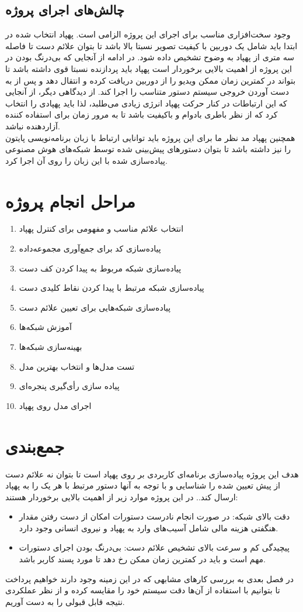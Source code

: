 \subsection{چالش‌های اجرای پروژه}
وجود سخت‌افزاری مناسب برای اجرای این پروژه الزامی است. پهپاد انتخاب شده در ابتدا باید شامل یک دوربین با کیفیت تصویر
نسبتا بالا باشد تا بتوان علائم دست تا فاصله سه متری از پهپاد به وضوح تشخيص داده شود.
در ادامه از آنجایی که بی‌درنگ بودن در این پروژه از اهمیت بالایی برخوردار است پهپاد باید پردازنده نسبتا قوی داشته باشد تا بتواند در کمترین زمان ممکن ویدیو را از دوربین دریافت کرده و انتقال دهد و پس از به دست آوردن خروجی سیستم دستور متناسب را اجرا کند. از دیدگاهی دیگر، از آنجایی که این ارتباطات در کنار حرکت پهپاد انرژی زیادی می‌طلبد، لذا باید پهپادی را انتخاب کرد
که از نظر باطری بادوام و باکیفیت باشد تا به مرور زمان برای استفاده کننده آزاردهنده نباشد.
\\
همچنین پهپاد مد نظر ما برای این پروژه باید توانایی ارتباط با  زبان برنامه‌نویسی پایتون را نیز داشته باشد تا بتوان دستورهای پیش‌بینی شده توسط شبکه‌های هوش مصنوعی پیاده‌سازی شده با این زبان را روی آن اجرا کرد.


\section{مراحل انجام پروژه}
\begin{enumerate}
    \item  انتخاب علائم‌ مناسب و مفهومی برای کنترل پهپاد
    \item  پیاده‌سازی کد برای جمع‌آوری مجموعه‌داده
    \item  پیاده‌سازی شبکه مربوط به پیدا کردن کف دست 
    \item  پیاده‌سازی شبکه مرتبط با پیدا کردن نقاط کلیدی دست 
    \item  پیاده‌سازی شبکه‌هایی برای تعیین علائم دست
    \item  آموزش شبکه‌ها
    \item  بهینه‌سازی شبکه‌ها
    \item  تست مدل‌ها و انتخاب بهترین مدل
    \item  پیاده سازی رأی‌گیری پنجره‌ای
    \item  اجرای مدل روی پهپاد
\end{enumerate}
 

\section{جمع‌بندی}
 هدف این پروژه پیاده‌سازی برنامه‌ای کاربردی بر روی پهپاد است تا بتوان نه علائم دست از پیش تعیین شده را شناسایی و با توجه به آنها دستور مرتبط با هر یک را به پهپاد ارسال کند..
 در این پروژه موارد زیر از اهمیت بالایی برخوردار هستند:
 \begin{itemize}
    \item دقت بالای شبکه: در صورت انجام نادرست دستورات امکان از دست رفتن مقدار هنگفتی هزینه مالی شامل آسیب‌های وارد به پهپاد و نیروی انسانی وجود دارد.
    \item پیچیدگی کم و سرعت بالای تشخیص علائم دست: بی‌درنگ بودن اجرای دستورات مهم است و باید در کمترین زمان ممکن رخ دهد تا مورد پسند کاربر باشد.
\end{itemize}

در فصل بعدی به بررسی کار‌های مشابهی که در این زمینه وجود دارند خواهیم پرداخت تا بتوانیم با استفاده از آن‌ها دقت سیستم خود را مقایسه کرده و از نظر 
عملکردی نتیجه قابل قبولی را به دست آوریم.


